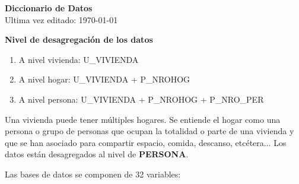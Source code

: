 \documentclass[12pt,a4paper]{article}
\begin{document}
\begin{center}
	\textbf{Diccionario de Datos} \\
	Ultima vez editado: \today
\end{center}
\vspace{10mm}

\textbf{Nivel de desagregación de los datos}
\begin{enumerate}
	\item A nivel vivienda: U\_VIVIENDA
	\item A nivel hogar: U\_VIVIENDA + P\_NROHOG
	\item A nivel persona: U\_VIVIENDA + P\_NROHOG + P\_NRO\_PER
\end{enumerate}

Una vivienda puede tener múltiples hogares. Se entiende el hogar como una persona o grupo de personas que ocupan la totalidad o parte de una vivienda y que se han asociado para compartir espacio, comida, descanso, etcétera... Los datos están desagregados al nivel de \textbf{PERSONA}.
	
Las bases de datos se componen de 32 variables:
\end{document}
